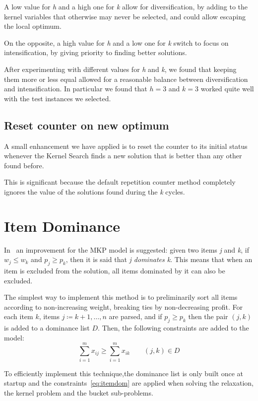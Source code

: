 A low value for \textit{h} and a high one for \textit{k} allow for
diversification, by adding to the kernel variables that otherwise
may never be selected, and could allow escaping the local optimum.

On the opposite, a high value for \textit{h} and a low one for \textit{k}
switch to focus on intensification, by giving priority to finding
better solutions.

After experimenting with different values for \textit{h} and \textit{k},
we found that keeping them more or less equal allowed for
a reasonable balance between diversification and intensification.
In particular we found that \(h=3\) and \(k=3\) worked quite well
with the test instances we selected.

\subsection{Reset counter on new optimum}
A small enhancement we have applied is to reset the counter to its initial status
whenever the Kernel Search finds a new solution
that is better than any other found before.

This is significant because the default repetition counter
method completely ignores the value of the solutions found
during the \textit{k} cycles.


\section{Item Dominance}
In~\cite{mkp:2019} an improvement for the MKP model is suggested:
given two items \textit{j} and \textit{k}, if \(w_{j} \leq w_{k}\)
and \(p_{j} \geq p_{k}\), then it is said that \textit{j dominates k}.
This means that when an item is excluded from the solution,
all items dominated by it can also be excluded.

The simplest way to implement this method is to preliminarily sort all
items according to non-increasing weight, breaking ties by
non-decreasing profit.
For each item \(k\), items \(j \coloneqq k+1,\dots,n\) are parsed,
and if \(p_{j} \geq p_{k}\) then the pair \((j,k)\) is added to a
dominance list \(D\).
Then, the following constraints are added to the model:
\begin{equation}
    \label{eq:itemdom}
    \sum_{i=1}^{m} x_{ij} \geq \sum_{i=1}^{m} x_{ik} \qquad (j,k) \in D
\end{equation}

To efficiently implement this technique,the dominance list is only built once at startup
and the constraints~\eqref{eq:itemdom} are applied when solving
the relaxation, the kernel problem and the bucket sub-problems.



